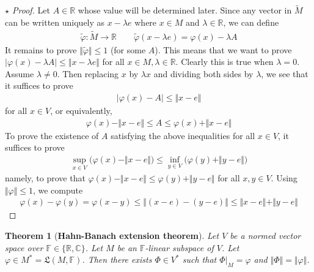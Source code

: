 \documentclass[12pt,b5paper,notitlepage]{article}
\theoremstyle{definition}
\theoremstyle{plain}
\newtheorem{thm}[df]{Theorem}
\newcommand{\fk}{\mathfrak}
\newcommand{\wtd}{\widetilde}
\newcommand{\Cbb}{\mathbb C}
\newcommand{\Rbb}{\mathbb R}
\newcommand{\Fbb}{\mathbb F}
\numberwithin{equation}{section}
\begin{document}
\begin{proof}[$\star$ Proof]
Let $A\in\Rbb$ whose value will be determined later. Since any vector in $\wtd M$ can be written uniquely as  $x-\lambda e$ where $x\in M$ and $\lambda\in\Rbb$, we can define
\begin{align*}
\wtd\varphi:\wtd M\rightarrow\Rbb\qquad \wtd\varphi(x-\lambda e)=\varphi(x)-\lambda A
\end{align*}
It remains to prove $\Vert\wtd\varphi\Vert\leq 1$ (for some $A$). This means that we want to prove $|\varphi(x)-\lambda A|\leq \Vert x-\lambda e\Vert$ for all $x\in M,\lambda\in\Rbb$. Clearly this is true when $\lambda=0$. Assume $\lambda\neq 0$. Then replacing $x$ by $\lambda x$ and dividing both sides by $\lambda$, we see that it suffices to prove
\begin{align*}
|\varphi(x)-A|\leq \Vert x-e\Vert
\end{align*}
for all $x\in V$, or equivalently, 
\begin{align*}
\varphi(x)-\Vert x-e\Vert\leq A\leq \varphi(x)+\Vert x-e\Vert
\end{align*}
To prove the existence of $A$ satisfying the above inequalities for all $x\in V$, it suffices to prove
\begin{align}\label{eq227}
\sup_{x\in V}\big(\varphi(x)-\Vert x-e\Vert\big)\leq \inf_{y\in V}\big(\varphi(y)+\Vert y-e\Vert\big)
\end{align}
namely, to prove that $\varphi(x)-\Vert x-e\Vert\leq \varphi(y)+\Vert y-e\Vert$ for all $x,y\in V$. Using $\Vert\varphi\Vert\leq1$, we compute
\begin{align*}
\varphi(x)-\varphi(y)=\varphi(x-y)\leq \Vert(x-e)-(y-e)\Vert\leq \Vert x-e\Vert+\Vert y-e\Vert
\end{align*}
\end{proof}


\begin{thm}[\textbf{Hahn-Banach extension theorem}] \label{lb499} 
Let $V$ be a normed vector space over $\Fbb\in\{\Rbb,\Cbb\}$. Let $M$ be an $\Fbb$-linear subspace of $V$. Let $\varphi\in M^*=\fk L(M,\Fbb)$. Then there exists $\Phi\in V^*$ such that $\Phi|_M=\varphi$ and $\Vert\Phi\Vert=\Vert\varphi\Vert$.
\end{thm}
\end{document}
